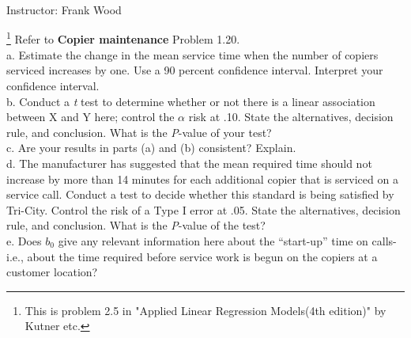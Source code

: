 \documentclass[12pt]{article}
\begin{document}
 \begin{center}
  Instructor: Frank Wood
 \end{center}
{}
\finishfirstpage



 {\footnote[1]{This is
problem 2.5 in "Applied Linear Regression Models(4th edition)" by
Kutner etc.} 
 Refer to \textbf{Copier maintenance} Problem 1.20.\\
 a. Estimate the change in the mean service time when the number of copiers serviced increases by one. Use a 90 percent confidence interval. Interpret your confidence interval.\\
 b. Conduct a \textit{t} test to determine whether or not there is a linear association between X and Y here; control the $\alpha$ risk at .10. State the alternatives, decision rule, and conclusion. What is the \textit{P}-value of your test?\\
 c. Are your results in parts (a) and (b) consistent? Explain.\\
 d. The manufacturer has suggested that the mean required time should not increase by more than 14 minutes for each additional copier that is serviced on a service call. Conduct a test to decide whether this standard is being satisfied by Tri-City. Control the risk of a Type I error at .05. State the alternatives, decision rule, and conclusion. What is the \textit{P}-value of the test?\\
 e. Does $b_0$ give any relevant information here about the ``start-up'' time on calls-i.e., about the time required before service work is begun on the copiers at a customer location? 
   }
 { \vfill
  \answer
} { }
\end{document}
